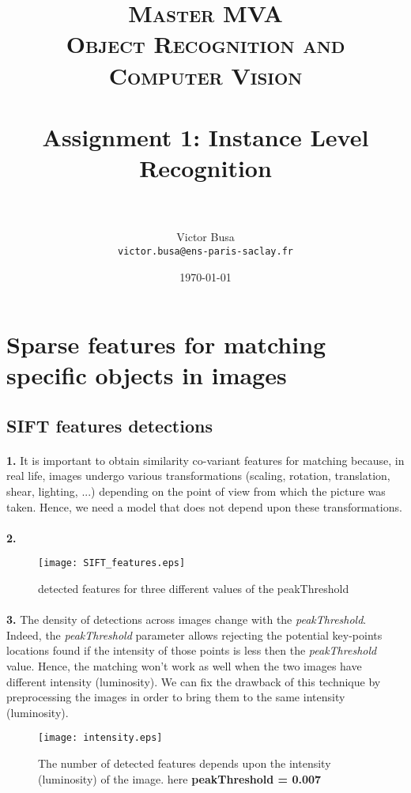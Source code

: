 \documentclass[11pt]{article}
\title{	
\normalfont \normalsize 
\textsc{Master MVA \\
Object Recognition and Computer Vision} \\ [20pt]
\horrule{0.5pt} \\[0.2cm] %
\textbf{Assignment 1}: Instance Level Recognition \\
\horrule{2pt} \\[0.3cm] %
}
\author{Victor Busa \\
   \texttt{victor.busa@ens-paris-saclay.fr}}
\date{\normalsize\today}
\numberwithin{figure}{section} %
\begin{document}
\maketitle

\section{Sparse features for matching specific objects in images}
\subsection{SIFT features detections}
\paragraph{}\textbf{1.} It is important to obtain similarity co-variant features for matching because, in real life, images undergo various transformations (scaling, rotation, translation, shear, lighting, ...)  depending on the point of view from which the picture was taken. Hence, we need a model that does not depend upon these transformations.

\paragraph{}\textbf{2.} 
\begin{figure}[!h] 
  \centering
	\texttt{[image: SIFT\_features.eps]}
  \caption{detected features for three different values of the peakThreshold}
\end{figure}

\paragraph{}\textbf{3.} The density of detections across images change with the \textit{peakThreshold}. Indeed, the \textit{peakThreshold} parameter allows rejecting the potential key-points locations found if the intensity of those points is less then the \textit{peakThreshold} value. Hence, the matching won't work as well when the two images have different intensity (luminosity). We can fix the drawback of this technique by preprocessing the images in order to bring them to the same intensity (luminosity).

\begin{figure}[!h] 
  \centering
	\captionsetup{justification=centering}
	\texttt{[image: intensity.eps]}
  \caption{The number of detected features depends upon the intensity (luminosity) of the image. here \textbf{peakThreshold = 0.007}}
\end{figure}
\end{document}
